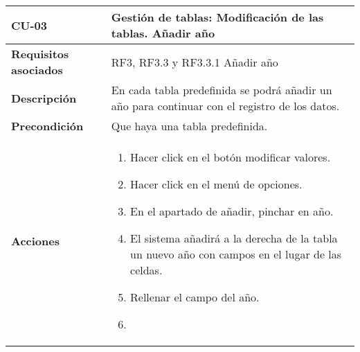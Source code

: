 \newpage
\begin{longtable}[H]{@{}ll@{}}
\toprule
\begin{minipage}[b]{0.23\columnwidth}\raggedright\strut
\textbf{CU-03}\strut
\end{minipage} & \begin{minipage}[b]{0.71\columnwidth}\raggedright\strut
\textbf{Gestión de tablas: Modificación de las tablas. Añadir año}\strut
\end{minipage}\tabularnewline
\midrule
\endhead
\begin{minipage}[t]{0.23\columnwidth}\raggedright\strut
\textbf{Requisitos asociados}\strut
\end{minipage} & \begin{minipage}[t]{0.71\columnwidth}\raggedright\strut
RF3, RF3.3 y RF3.3.1 Añadir año\strut
\end{minipage}\tabularnewline
\begin{minipage}[t]{0.23\columnwidth}\raggedright\strut
\textbf{Descripción}\strut
\end{minipage} & \begin{minipage}[t]{0.71\columnwidth}\raggedright\strut
En cada tabla predefinida se podrá añadir un año para continuar con el registro
de los datos.
\strut
\end{minipage}\tabularnewline
\begin{minipage}[t]{0.23\columnwidth}\raggedright\strut
\textbf{Precondición}\strut
\end{minipage} & \begin{minipage}[t]{0.71\columnwidth}\raggedright\strut
Que haya una tabla predefinida.\strut
\end{minipage}\tabularnewline
\begin{minipage}[t]{0.23\columnwidth}\raggedright\strut
\textbf{Acciones}\strut
\end{minipage} & \begin{minipage}[t]{0.71\columnwidth}\raggedright\strut
\begin{enumerate}
\def\labelenumi{\arabic{enumi}.}
\tightlist
\item
Hacer click en el botón modificar valores.
\item
Hacer click en el menú de opciones.
\item
En el apartado de añadir, pinchar en año.
\item
El sistema añadirá a la derecha de la tabla un nuevo año con
campos en el lugar de las celdas.
\item 
Rellenar el campo del año.
\item

\end{enumerate}
\end{minipage}
\end{longtable}
